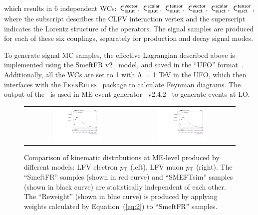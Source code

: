which results in 6 independent \acp{WC}: $\textsf{C}^{\textsf{vector}}_{\textsf{e}\upmu\textsf{{u}t}},~\textsf{C}^{\textsf{scalar}}_{\textsf{e}\upmu\textsf{{u}t}},~\textsf{C}^{\textsf{tensor}}_{\textsf{e}\upmu\textsf{{u}t}},~\textsf{C}^{\textsf{vector}}_{\textsf{e}\upmu\textsf{{c}t}},~\textsf{C}^{\textsf{scalar}}_{\textsf{e}\upmu\textsf{{c}t}},~\textsf{C}^{\textsf{tensor}}_{\textsf{e}\upmu\textsf{{c}t}}$, where the subscript describes the \ac{CLFV} interaction vertex and the superscript indicates the Lorentz structure of the operators. The signal samples are produced for each of these six couplings, separately for production and decay signal modes.

To generate signal \ac{MC} samples, the effective Lagrangian described above is implemented using the SmeftFR v2~\cite{Dedes:2019uzs} model, and saved in the ``UFO'' format~\cite{Degrande:2011ua}. Additionally, all the \acp{WC} are set to 1 with $\mathrm{\Lambda}$ = 1 TeV in the UFO, which then interfaces with the \textsc{FeynRules}~\cite{Christensen:2008py} package to calculate Feynman diagrams. The output of the \FR~is used in \ac{ME} event generator \MG~v2.4.2~\cite{Alwall:2014hca} to generate events at \ac{LO}. 

\begin{figure}[tbh!]
 \begin{center}
 \begin{tabular}{cc}
 \includegraphics[width=0.48\textwidth]{figures/Part3/Samples/LFVePt}&
 \includegraphics[width=0.48\textwidth]{figures/Part3/Samples/LFVmuPt}\\
 \end{tabular}
 \caption{Comparison of kinematic distributions at \ac{ME}-level produced by different models: LFV electron $p_{\textsf{T}}$ (left), LFV muon $p_{\textsf{T}}$ (right). The ``SmeftFR'' samples (shown in red curve) and ``SMEFTsim'' samples (shown in black curve) are statistically independent of each other. The ``Reweight'' (shown in blue curve) is produced by applying weights calculated by Equation~(\ref{eq:2}) to ``SmeftFR'' samples.}
 \label{fig:reweight}
 \end{center}
\end{figure}

